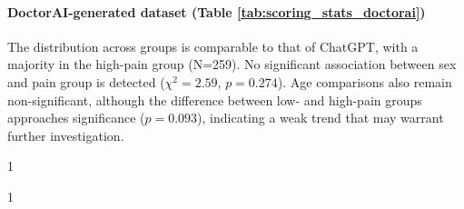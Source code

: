 \documentclass[preprint,12pt,authoryear]{elsarticle}
\begin{document}
\paragraph{DoctorAI-generated dataset (Table \ref{tab:scoring_stats_doctorai})}
The distribution across groups is comparable to that of ChatGPT, with a majority in the high-pain group (N=259). No significant association between sex and pain group is detected ($\chi^2 = 2.59$, $p = 0.274$). Age comparisons also remain non-significant, although the difference between low- and high-pain groups approaches significance ($p = 0.093$), indicating a weak trend that may warrant further investigation.

\begin{table}[t!]
\centering

\begin{subtable}{1\textwidth}
\centering
{}
\caption{ChatGPT}
\label{tab:scoring_stats_chatgpt}
\end{subtable}
\hfill
\begin{subtable}{1\textwidth}
\centering
{}
\end{subtable}
\end{table}
\end{document}
